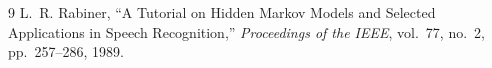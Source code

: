 \documentclass[11pt]{article}
\begin{document}
\begin{thebibliography}{9}
L.~R. Rabiner, ``A Tutorial on Hidden Markov Models and Selected Applications in Speech Recognition,'' \textit{Proceedings of the IEEE}, vol.~77, no.~2, pp.~257--286, 1989.
\end{thebibliography}
\end{document}
